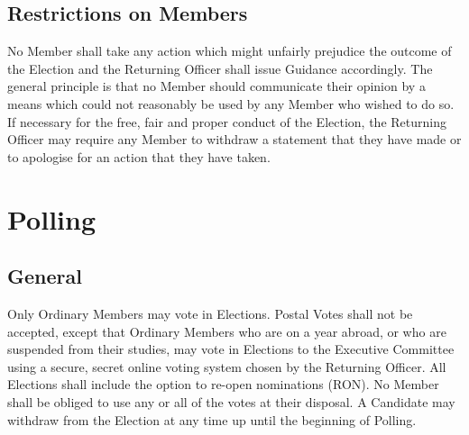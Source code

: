 \subsection{Restrictions on Members}
\npara No Member shall take any action which might unfairly prejudice the outcome of the Election and the Returning Officer shall issue Guidance accordingly.  The general principle is that no Member should communicate their opinion by a means which could not reasonably be used by any Member who wished to do so.
\npara If necessary for the free, fair and proper conduct of the Election, the Returning Officer may require any Member to withdraw a statement that they have made or to apologise for an action that they have taken. 
\section{Polling} \label{sec:polling}
\subsection{General}
\npara Only Ordinary Members may vote in Elections.
\npara Postal Votes shall not be accepted, except that Ordinary Members who are on a year abroad, or who are suspended from their studies, may vote in Elections to the Executive Committee using a secure, secret online voting system chosen by the Returning Officer.
\npara All Elections shall include the option to re-open nominations (RON).
\npara No Member shall be obliged to use any or all of the votes at their disposal.
\npara A Candidate may withdraw from the Election at any time up until the beginning of Polling.
